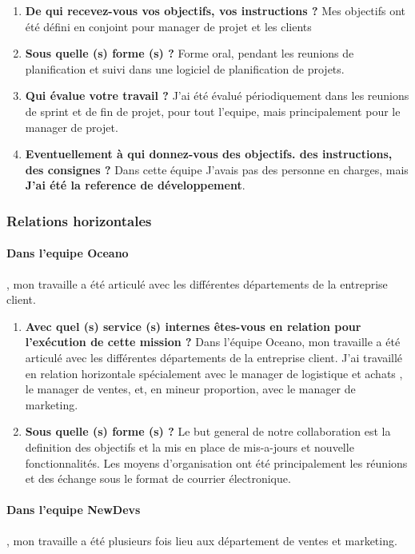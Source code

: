 \documentclass{resume} %
\begin{document}
		\begin{enumerate}
		\item \textbf{De qui recevez-vous vos objectifs, vos instructions ?}
			Mes objectifs ont été défini en conjoint pour manager de projet et les clients
		\item \textbf{Sous quelle (s) forme (s) ?}
			Forme oral, pendant les reunions de planification et suivi dans une logiciel de planification de projets.
		\item \textbf{Qui évalue votre travail ?}
			J'ai été évalué périodiquement dans les reunions de sprint et de fin de projet, pour tout l'equipe, mais principalement pour le manager de projet. 
		\item  \textbf{Eventuellement à qui donnez-vous des objectifs. des instructions, des consignes ?}
			Dans cette équipe J'avais pas des  personne en charges, mais \textbf{J'ai été la reference de développement}.
		\end{enumerate}
		
					
	\subsubsection{Relations horizontales}
	
	
		\paragraph{Dans l'equipe Oceano},  mon travaille a été articulé  avec  les différentes départements de la entreprise client.
		
		\begin{enumerate}
		\item \textbf{ Avec quel (s) service (s) internes êtes-vous en relation pour l'exécution de cette mission ?}
			Dans l'équipe Oceano, mon travaille a été articulé  avec  les différentes départements de la entreprise client. J'ai travaillé en relation horizontale spécialement avec le manager de logistique et achats , le manager de ventes, et, en mineur proportion, avec le manager de marketing. 
		\item \textbf{Sous quelle (s) forme (s) ?}
			Le but general de notre collaboration est la definition des objectifs et la mis en place de mis-a-jours et nouvelle fonctionnalités. 
			Les moyens d'organisation ont été principalement les réunions et des échange sous le format de courrier électronique. 
		\end {enumerate}	
		
		\paragraph{Dans l'equipe NewDevs}, mon travaille a été plusieurs fois lieu aux département de ventes et marketing. 
		
\end{document}
